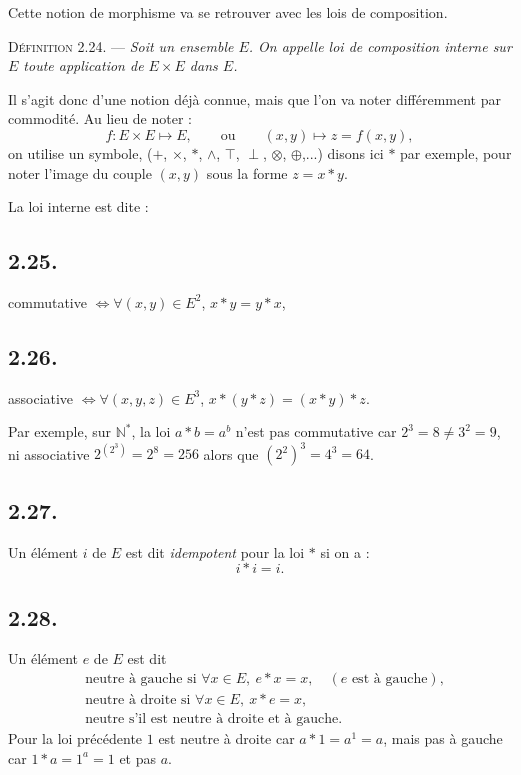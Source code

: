 Cette notion de morphisme va se retrouver avec les lois de composition.

\medskip\noindent\textsc{Définition 2.24.} --- \emph{Soit un ensemble $E$. On appelle loi de composition interne sur $E$ toute application de $E\times E$ dans $E$.}

Il s'agit donc d'une notion déjà connue, mais que l'on va noter différemment par commodité. Au lieu de noter :
\[
f:E\times E\longmapsto E,\qquad\text{ou}\qquad (x,y)\longmapsto z=f(x,y),
\]
on utilise un symbole, ($+$, $\times$, $*$, $\wedge$, $\top$, $\perp$, $\otimes$, $\oplus$,...) disons ici $*$ par exemple, pour noter l'image du couple $(x,y)$ sous la forme $z=x*y$.

La loi interne est dite :

\subsection*{2.25.}
commutative $\Leftrightarrow\forall(x,y)\in E^2$, $x*y=y*x$,

\subsection*{2.26.}
associative $\Leftrightarrow\forall(x,y,z)\in E^3$, $x*(y*z)=(x*y)*z$.

Par exemple, sur $\mathbb N^*$, la loi $a*b=a^b$ n'est pas commutative car $2^3=8\ne3^2=9$, ni associative $2^{(2^3)}=2^8=256$ alors que $(2^2)^3=4^3=64$.

\subsection*{2.27.}
Un élément $i$ de $E$ est dit \emph{idempotent} pour la loi $*$ si on a :
\[
i*i=i.
\]

\subsection*{2.28.}
Un élément $e$ de $E$ est dit
\begin{align*}
&\text{neutre à gauche si }\forall x\in E,\ e*x=x,\quad(e\text{ est à gauche}),\\
&\text{neutre à droite si }\forall x\in E,\ x*e=x,\\
&\text{neutre s'il est neutre à droite et à gauche.}
\end{align*}
Pour la loi précédente $1$ est neutre à droite car $a*1=a^1=a$, mais pas à gauche car $1*a=1^a=1$ et pas $a$.

